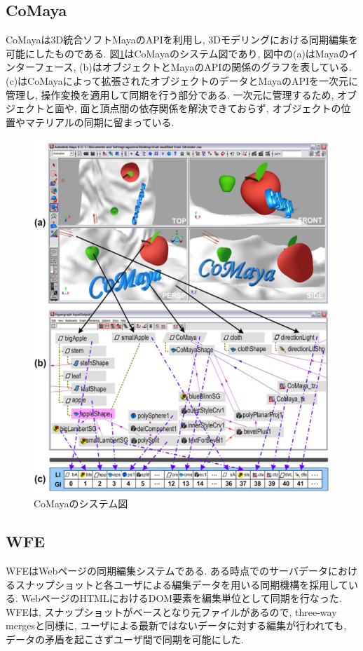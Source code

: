 \subsection{CoMaya}
CoMayaは3D統合ソフトMayaのAPIを利用し, 3Dモデリングにおける同期編集を可能にしたものである.
図\ref{comayapng}はCoMayaのシステム図であり, 図中の(a)はMayaのインターフェース, (b)はオブジェクトとMayaのAPIの関係のグラフを表している. (c)はCoMayaによって拡張されたオブジェクトのデータとMayaのAPIを一次元に管理し, 操作変換を適用して同期を行う部分である.
一次元に管理するため, オブジェクトと面や, 面と頂点間の依存関係を解決できておらず, オブジェクトの位置やマテリアルの同期に留まっている.
\begin{figure}[htbp]
  \begin{center}
    \includegraphics[scale=0.5]{images/comaya}
    \caption{CoMayaのシステム図}
    \label{comayapng}
  \end{center}
\end{figure}
%
\subsection{WFE}
WFE\cite{WFE}はWebページの同期編集システムである. ある時点でのサーバデータにおけるスナップショットと各ユーザによる編集データを用いる同期機構を採用している. WebページのHTMLにおけるDOM要素を編集単位として同期を行なった. WFEは, スナップショットがベースとなり元ファイルがあるので, three-way mergesと同様に, ユーザによる最新ではないデータに対する編集が行われても, データの矛盾を起こさずユーザ間で同期を可能にした.
